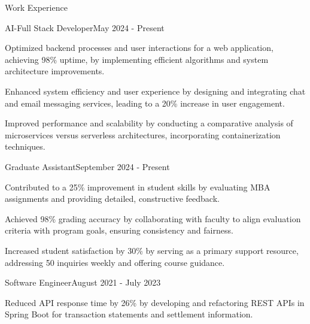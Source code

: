 \documentclass{resume} %
\begin{document}
    \begin{rSection}{Work Experience}
                    \begin{rSubsection}
                {AI{-}Full Stack Developer}{May 2024 - Present}
                                    {}
                                {}
                                    \item Optimized backend processes and user interactions for a web application, achieving 98\% uptime, by implementing efficient algorithms and system architecture improvements.
                                    \item Enhanced system efficiency and user experience by designing and integrating chat and email messaging services, leading to a 20\% increase in user engagement.
                                    \item Improved performance and scalability by conducting a comparative analysis of microservices versus serverless architectures, incorporating containerization techniques.
                            \end{rSubsection}
                    \begin{rSubsection}
                {Graduate Assistant}{September 2024 - Present}
                                    {}
                                {}
                                    \item Contributed to a 25\% improvement in student skills by evaluating MBA assignments and providing detailed, constructive feedback.
                                    \item Achieved 98\% grading accuracy by collaborating with faculty to align evaluation criteria with program goals, ensuring consistency and fairness.
                                    \item Increased student satisfaction by 30\% by serving as a primary support resource, addressing 50 inquiries weekly and offering course guidance.
                            \end{rSubsection}
                    \begin{rSubsection}
                {Software Engineer}{August 2021 - July 2023}
                                    {}
                                {}
                                    \item Reduced API response time by 26\% by developing and refactoring REST APIs in Spring Boot for transaction statements and settlement information.

\end{rSubsection}
\end{rSection}
\end{document}
